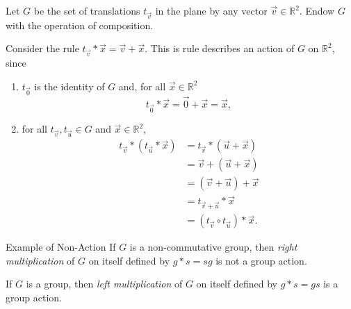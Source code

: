 
\begin{exmp}{}{}
Let \(G\) be the set of translations \(t_{\vec v}\) in the plane by any vector \(\vec v \in \mathbb{R}^2\).
Endow \(G\) with the operation of composition.

Consider the rule \(t_{\vec v} * \vec x = \vec v + \vec x\). This is rule describes an action of \(G\) on \(\mathbb{R}^2\), since
\begin{enumerate}
  \item \(t_{\vec 0}\) is the identity of \(G\) and, for all \(\vec x \in \mathbb{R}^2\) \[
	  t_{\vec 0} * \vec x = \vec 0 + \vec x = \vec x,
	\]
  \item for all \(t_{\vec v}, t_{\vec u} \in G\) and \(\vec x \in \mathbb{R}^2\),
	\begin{align*}
		t_{\vec v} * (t_{\vec u} * \vec x)
			&= t_{\vec v} * (\vec u + \vec x) \\
			&= \vec v + (\vec u + \vec x) \\
			&= (\vec v + \vec u) + \vec x \\
			&= t_{\vec v + \vec u} * \vec x \\
			&= (t_{\vec v} \circ t_{\vec u}) * \vec x.
	\end{align*}
\end{enumerate} 
\end{exmp}

\begin{exmp}{Example of Non-Action}{}
	If \(G\) is a non-commutative group, then \emph{right multiplication} of \(G\) on itself defined by \(g * s = sg\) is not a group action.
\end{exmp}

\begin{exmp}{}{}
	If \(G\) is a group, then \emph{left multiplication} of \(G\) on itself defined by \(g * s = gs\) is a group action.
\end{exmp}
